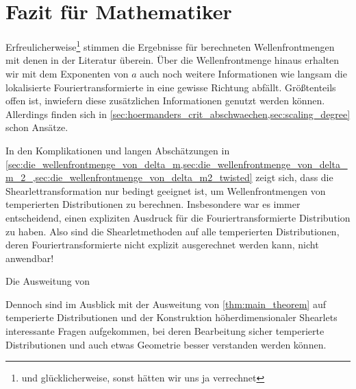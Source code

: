 \section{Fazit für Mathematiker} %
\label{sec:fazit_für_mathematiker}


Erfreulicherweise\footnote{und glücklicherweise, sonst hätten wir uns ja verrechnet} stimmen die Ergebnisse für berechneten Wellenfrontmengen mit denen in der Literatur überein. Über die Wellenfrontmenge hinaus erhalten wir mit dem Exponenten von $a$ auch noch weitere Informationen wie langsam die lokalisierte Fouriertransformierte in eine gewisse Richtung abfällt. Größtenteils offen ist, inwiefern diese zusätzlichen Informationen genutzt werden können. Allerdings finden sich in \cref{sec:hoermanders_crit_abschwaechen,sec:scaling_degree} schon Ansätze.

In den Komplikationen und langen Abschätzungen in \cref{sec:die_wellenfrontmenge_von_delta_m,sec:die_wellenfrontmenge_von_delta_m_2_,sec:die_wellenfrontmenge_von_delta_m2_twisted} zeigt sich, dass die Shearlettransformation nur bedingt geeignet ist, um Wellenfrontmengen von temperierten Distributionen zu berechnen. Insbesondere war es immer entscheidend, einen expliziten Ausdruck für die Fouriertransformierte Distribution zu haben. Also sind die Shearletmethoden auf alle temperierten Distributionen, deren Fouriertransformierte nicht explizit ausgerechnet werden kann, nicht anwendbar!

Die Ausweitung von

Dennoch sind im Ausblick mit der Ausweitung von \cref{thm:main_theorem} auf temperierte Distributionen und  der Konstruktion höherdimensionaler Shearlets interessante Fragen aufgekommen, bei deren Bearbeitung sicher temperierte Distributionen und auch etwas Geometrie besser verstanden werden können.

